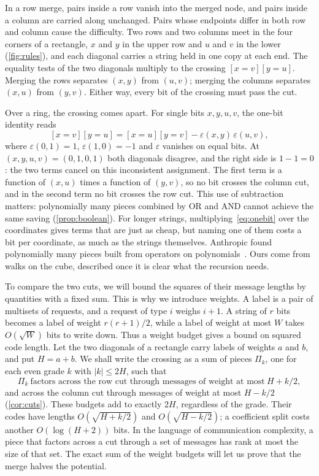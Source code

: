 \documentclass[11pt]{article}
\theoremstyle{definition}
\theoremstyle{definition}
\theoremstyle{remark}
\begin{document}
In a row merge, pairs inside a row vanish into the merged node, and pairs inside a column are carried along unchanged. Pairs whose endpoints differ in both row and column cause the difficulty. Two rows and two columns meet in the four corners of a rectangle, $x$ and $y$ in the upper row and $u$ and $v$ in the lower (\cref{fig:rules}), and each diagonal carries a string held in one copy at each end. The equality tests of the two diagonals multiply to the crossing $[x=v][y=u]$. Merging the rows separates $(x,y)$ from $(u,v)$; merging the columns separates $(x,u)$ from $(y,v)$. Either way, every bit of the crossing must pass the cut.

Over a ring, the crossing comes apart. For single bits $x,y,u,v$, the one-bit identity reads
\begin{equation}\label{eq:onebit}
[x=v][y=u]=[x=u][y=v]-\varepsilon(x,y)\,\varepsilon(u,v),
\end{equation}
where $\varepsilon(0,1)=1$, $\varepsilon(1,0)=-1$ and $\varepsilon$ vanishes on equal bits. At $(x,y,u,v)=(0,1,0,1)$ both diagonals disagree, and the right side is $1-1=0$: the two terms cancel on this inconsistent assignment. The first term is a function of $(x,u)$ times a function of $(y,v)$, so no bit crosses the column cut, and in the second term no bit crosses the row cut. This use of subtraction matters: polynomially many pieces combined by OR and AND cannot achieve the same saving (\cref{prop:boolean}). For longer strings, multiplying~\eqref{eq:onebit} over the coordinates gives terms that are just as cheap, but naming one of them costs a bit per coordinate, as much as the strings themselves. Anthropic found polynomially many pieces built from operators on polynomials~\cite[Appendix~B]{Ant26}. Ours come from walks on the cube, described once it is clear what the recursion needs.

To compare the two cuts, we will bound the squares of their message lengths by quantities with a fixed sum. This is why we introduce weights. A label is a pair of multisets of requests, and a request of type $i$ weighs $i+1$. A string of $r$ bits becomes a label of weight $r(r+1)/2$, while a label of weight at most $W$ takes $O(\sqrt W)$ bits to write down. Thus a weight budget gives a bound on squared code length. Let the two diagonals of a rectangle carry labels of weights $a$ and $b$, and put $H=a+b$. We shall write the crossing as a sum of pieces $\Pi_k$, one for each even grade $k$ with $|k|\le2H$, such that
\[
\Pi_k\ \text{factors across the row cut through messages of weight at most}\ H+k/2,
\]
and across the column cut through messages of weight at most $H-k/2$ (\cref{cor:cuts}). These budgets add to exactly $2H$, regardless of the grade. Their codes have lengths $O(\sqrt{H+k/2})$ and $O(\sqrt{H-k/2})$; a coefficient split costs another $O(\log(H+2))$ bits. In the language of communication complexity, a piece that factors across a cut through a set of messages has rank at most the size of that set. The exact sum of the weight budgets will let us prove that the merge halves the potential.
\end{document}
